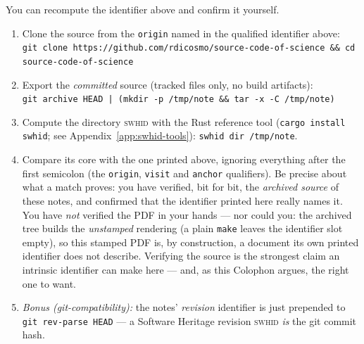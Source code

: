 \begin{handson}
You can recompute the identifier above and confirm it yourself.
\begin{enumerate}[nosep,leftmargin=*]
  \item Clone the source from the \texttt{origin} named in the qualified identifier above:\\
        \texttt{git clone https://github.com/rdicosmo/source-code-of-science \&\& cd
        source-code-of-science}
  \item Export the \emph{committed} source (tracked files only, no build artifacts):\\
        \texttt{git archive HEAD | (mkdir -p /tmp/note \&\& tar -x -C /tmp/note)}
  \item Compute the directory \textsc{swhid} with the Rust reference tool (\texttt{cargo install
        swhid}; see Appendix~\ref{app:swhid-tools}): \texttt{swhid dir /tmp/note}.
  \item Compare its core  with the one printed above, ignoring
        everything after the first semicolon (the \texttt{origin}, \texttt{visit} and
        \texttt{anchor} qualifiers). Be precise about what a match proves: you have verified,
        bit for bit, the \emph{archived source} of these notes, and confirmed that the
        identifier printed here really names it. You have \emph{not} verified the PDF in your
        hands --- nor could you: the archived tree builds the \emph{unstamped} rendering (a
        plain \texttt{make} leaves the identifier slot empty), so this stamped PDF is, by
        construction, a document its own printed identifier does not describe. Verifying the
        source is the strongest claim an intrinsic identifier can make here --- and, as this
        Colophon argues, the right one to want.
  \item \emph{Bonus (git-compatibility):} the notes' \emph{revision} identifier is just
         prepended to \texttt{git rev-parse HEAD} --- a Software Heritage
        revision \textsc{swhid} \emph{is} the git commit hash.
\end{enumerate}
\end{handson}
